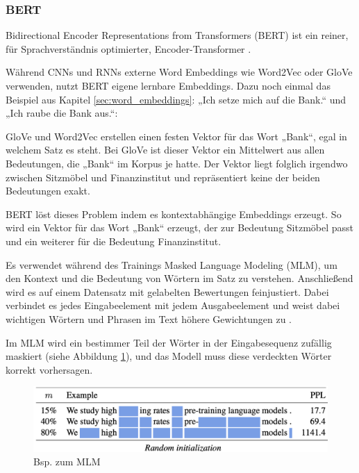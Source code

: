 \subsubsection{BERT} \label{sec04:bert}

Bidirectional Encoder Representations from Transformers (BERT) ist ein reiner, für Sprachverständnis optimierter, Encoder-Transformer \cite{devlin2019}.

Während CNNs und RNNs externe Word Embeddings wie Word2Vec oder GloVe verwenden, nutzt BERT eigene lernbare Embeddings.
Dazu noch einmal das Beispiel aus Kapitel \ref{sec:word_embeddings}: „Ich setze mich auf die Bank.“ und „Ich raube die Bank aus.“:

GloVe und Word2Vec erstellen einen festen Vektor für das Wort „Bank“, egal in welchem Satz es steht.
Bei GloVe ist dieser Vektor ein Mittelwert aus allen Bedeutungen, die „Bank“ im Korpus je hatte.
Der Vektor liegt folglich irgendwo zwischen Sitzmöbel und Finanzinstitut und repräsentiert keine der beiden Bedeutungen exakt.

BERT löst dieses Problem indem es kontextabhängige Embeddings erzeugt. So wird ein Vektor für das Wort „Bank“ erzeugt, der zur Bedeutung
Sitzmöbel passt und ein weiterer für die Bedeutung Finanzinstitut.

Es verwendet während des Trainings Masked Language Modeling (MLM), um den Kontext und die Bedeutung von Wörtern im Satz zu verstehen.
Anschließend wird es auf einem Datensatz mit gelabelten Bewertungen feinjustiert. 
Dabei verbindet es jedes Eingabeelement mit jedem Ausgabeelement und 
weist dabei wichtigen Wörtern und Phrasen im Text höhere Gewichtungen zu \cite{Deshai:2023aa}.

Im MLM wird ein bestimmer Teil der Wörter in der Eingabesequenz zufällig maskiert (siehe Abbildung \ref{fig:mlm_bert}), 
und das Modell muss diese verdeckten Wörter korrekt vorhersagen.

\begin{figure}[htbp]
    \begin{center}
        \includegraphics[scale=0.5]{static/mlm_bert.png}
        \caption{\label{fig:mlm_bert} Bsp. zum MLM \cite{wettig2023}}
    \end{center}
\end{figure}

